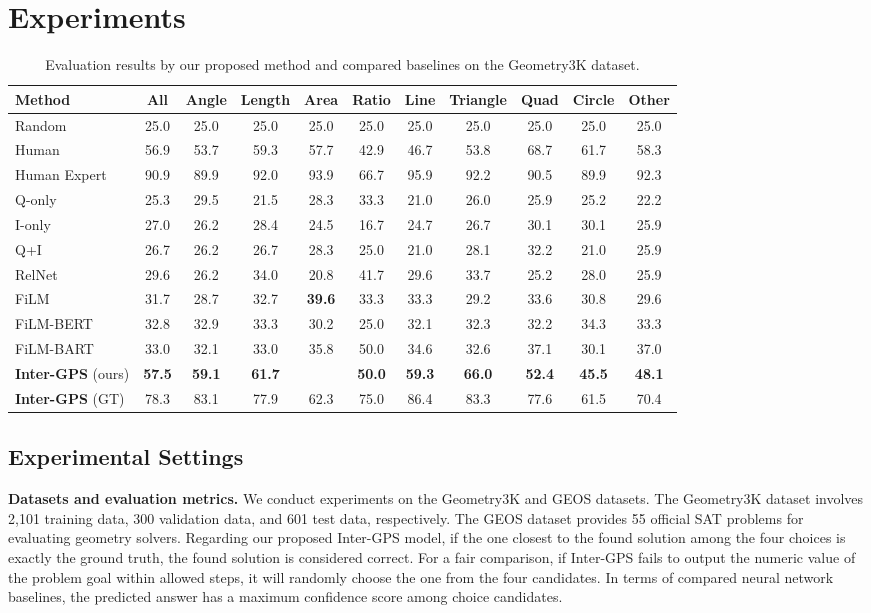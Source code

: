 \documentclass[11pt,a4paper]{article}
\begin{document}
\section{Experiments}
\begin{table*}[t!]
\centering 
\footnotesize
\begin{tabular}{lc|cccc|ccccc}
	\hline
	\textbf{Method} & All & Angle & Length & Area & Ratio  & Line & Triangle & Quad & Circle & Other \\
	\hline
	Random &25.0 &25.0 &25.0 &25.0 &25.0 &25.0 &25.0 &25.0 &25.0 &25.0  \\
	Human &56.9 &53.7 &59.3 &57.7 &42.9 &46.7 &53.8 &68.7 &61.7 &58.3 \\
	Human Expert &90.9 &89.9 &92.0 &93.9 &66.7 &95.9 &92.2 &90.5 &89.9 &92.3 \\
	\hline
	Q-only &25.3 &29.5 &21.5 &28.3 &33.3 &21.0 &26.0 &25.9 &25.2 &22.2 \\
	I-only &27.0 &26.2 &28.4 &24.5 &16.7 &24.7 &26.7 &30.1 &30.1 &25.9 \\
	Q+I  &26.7 &26.2 &26.7 &28.3 &25.0 &21.0 &28.1 &32.2 &21.0 &25.9 \\
RelNet \cite{bansal2017relnet} & 29.6 &26.2 &34.0 &20.8 &41.7 &29.6 &33.7 &25.2 &28.0 &25.9 \\
	FiLM \cite{perez2018film} &31.7 &28.7 &32.7 &\textbf{39.6} &33.3 &33.3 &29.2 &33.6 &30.8 &29.6\\
	FiLM-BERT \cite{devlin2018bert} & 32.8 &32.9 &33.3 &30.2 &25.0 &32.1 &32.3 &32.2 &34.3 &33.3 \\
	FiLM-BART \cite{lewis2020bart} & 33.0 &32.1 &33.0 &35.8 &50.0 &34.6 &32.6 &37.1 &30.1 &37.0 \\
	\hline
	\textbf{Inter-GPS} (ours) & \textbf{57.5} &\textbf{59.1} &\textbf{61.7} &\text{30.2} &\textbf{50.0} &\textbf{59.3} &\textbf{66.0} &\textbf{52.4} &\textbf{45.5} &\textbf{48.1} \\
	\textbf{Inter-GPS} (GT) & 78.3 &83.1 &77.9 &62.3 &75.0 &86.4 &83.3 &77.6 &61.5 &70.4 \\
	\hline
\end{tabular}
\caption{Evaluation results by our proposed method and compared baselines on the Geometry3K dataset.}\label{table:result}
\end{table*}

\subsection{Experimental Settings}
\textbf{Datasets and evaluation metrics.}
We conduct experiments on the Geometry3K and GEOS \citep{seo2015solving} datasets. The Geometry3K dataset involves 2,101 training data, 300 validation data, and 601 test data, respectively. The GEOS dataset provides 55 official SAT problems for evaluating geometry solvers. Regarding our proposed Inter-GPS model, if the one closest to the found solution among the four choices is exactly the ground truth, the found solution is considered correct.
For a fair comparison, if Inter-GPS fails to output the numeric value of the problem goal within allowed steps, it will randomly choose the one from the four candidates. In terms of compared neural network baselines, the predicted answer has a maximum confidence score among choice candidates.
\end{document}
